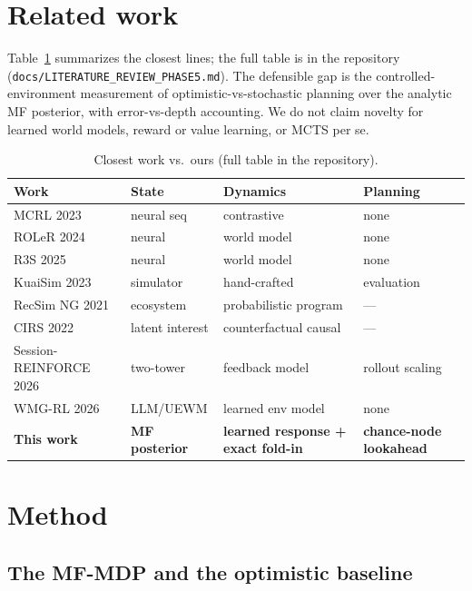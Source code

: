 \documentclass[11pt,a4paper]{article}
\begin{document}
\section{Related work}

Table~\ref{tab:related} summarizes the closest lines; the full table is in the
repository (\texttt{docs/LITERATURE\_REVIEW\_PHASE5.md}). The defensible gap is the
controlled-environment measurement of optimistic-vs-stochastic planning over the
analytic MF posterior, with error-vs-depth accounting. We do not claim novelty for
learned world models, reward or value learning, or MCTS per se.

\begin{table}[t]
\centering\small
\caption{Closest work vs.\ ours (full table in the repository).}
\label{tab:related}
\begin{tabular}{@{}llll@{}}
\toprule
Work & State & Dynamics & Planning \\
\midrule
MCRL 2023 & neural seq & contrastive & none \\
ROLeR 2024 & neural & world model & none \\
R3S 2025 & neural & world model & none \\
KuaiSim 2023 & simulator & hand-crafted & evaluation \\
RecSim NG 2021 & ecosystem & probabilistic program & --- \\
CIRS 2022 & latent interest & counterfactual causal & --- \\
Session-REINFORCE 2026 & two-tower & feedback model & rollout scaling \\
WMG-RL 2026 & LLM/UEWM & learned env model & none \\
\midrule
\textbf{This work} & \textbf{MF posterior} & \textbf{learned response + exact fold-in} &
\textbf{chance-node lookahead} \\
\bottomrule
\end{tabular}
\end{table}

\section{Method}

\subsection{The MF-MDP and the optimistic baseline}
\end{document}
